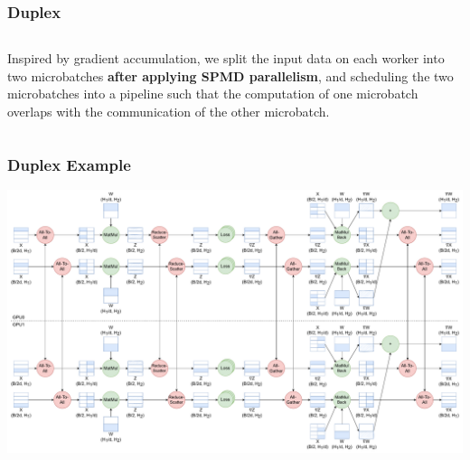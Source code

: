 \documentclass[12pt,aspectratio=169]{beamer}
\begin{document}
    \begin{frame}
        \frametitle{Duplex}

        \begin{columns}
            \begin{column}{0.54\textwidth}
                Inspired by gradient accumulation, we split the input data on each worker into two microbatches
                \textbf{after applying SPMD parallelism}, and scheduling the two microbatches into a pipeline such that
                the computation of one microbatch overlaps with the communication of the other microbatch.
            \end{column}
        \end{columns}
    \end{frame}

    \begin{frame}
        \frametitle{Duplex Example}

        \centering
        \includegraphics[width=.9\textwidth]{toy_example_duplex.pdf}
    \end{frame}
\end{document}
